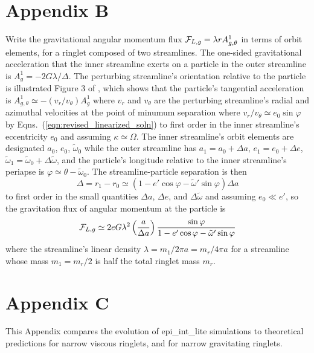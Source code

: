 \documentclass[preprint]{aastex62}
\begin{document}
\section{Appendix B}
\label{sec:Appendix B}

Write the gravitational angular momentum flux ${\cal F}_{L,g}=\lambda r A^1_{g,\theta}$
in terms of orbit elements, for a ringlet composed of two streamlines. The one-sided gravitational
acceleration that the inner streamline exerts on a particle in the outer streamline is
$A^1_g=-2G\lambda/\Delta$. The perturbing streamline's orientation relative to the particle
is illustrated Figure 3 of \cite{HS13}, which shows that the particle's tangential acceleration
is $A^1_{g,\theta}\simeq-(v_r/v_\theta)A^1_g$ where $v_r$ and $v_\theta$ are the perturbing 
streamline's radial and azimuthal velocities at the point of minumum separation
where $v_r/v_\theta\simeq e_0\sin\varphi$ by Eqns.\ (\ref{eqn:revised_linearized_soln}) 
to first order in the inner streamline's 
eccentricity $e_0$ and assuming $\kappa\simeq\Omega$. 
The inner streamline's orbit elements 
are designated $a_0$, $e_0$, $\tilde{\omega}_0$ while the outer streamline has
$a_1 = a_0 + \Delta a$, $e_1 = e_0 + \Delta e$, 
$\tilde{\omega}_1 = \tilde{\omega}_0 + \Delta \tilde{\omega}$, and
the particle's  longitude relative to the inner streamline's periapse is 
$\varphi\simeq\theta - \tilde{\omega}_0$.
The streamline-particle separation is then
\begin{equation}
    \label{eqn:Delta}
    \Delta = r_1 - r_0 \simeq (1 - e'\cos\varphi - \tilde{\omega}'\sin\varphi)\Delta a
\end{equation}
to first order in the small quantities $\Delta a$, $\Delta e$, and $\Delta\tilde{\omega}$
and assuming $e_0\ll e'$, so the gravitation flux of angular momentum
at the particle is 
 \begin{equation}
    \label{eqn:F_L_grav_approx}
    {\cal F}_{L,g} \simeq 2eG\lambda^2\left(\frac{a}{\Delta a}\right)
        \frac{\sin\varphi}{1 - e'\cos\varphi - \tilde{\omega}'\sin\varphi}
\end{equation}
where the streamline's linear density $\lambda=m_1/2\pi a = m_r/4\pi a$ for 
a streamline whose mass $m_1=m_r/2$ is half the total ringlet mass $m_r$.


\section{Appendix C}
\label{sec:Appendix C}

This Appendix compares the evolution of epi\_int\_lite simulations to theoretical predictions for 
narrow viscous ringlets, and for narrow gravitating ringlets.\\
\end{document}
